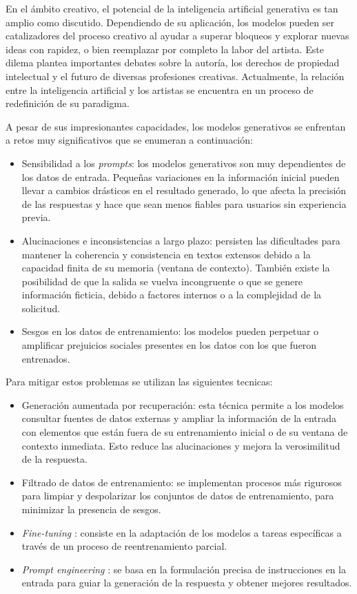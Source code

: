 En el ámbito creativo, el potencial de la inteligencia artificial generativa es tan amplio como discutido.
Dependiendo de su aplicación, los modelos pueden ser catalizadores del proceso creativo
al ayudar a superar bloqueos y explorar nuevas ideas con rapidez, o bien
reemplazar por completo la labor del artista. 
Este dilema plantea importantes debates sobre la autoría, los derechos de propiedad intelectual 
y el futuro de diversas profesiones creativas.
Actualmente, la relación entre la inteligencia artificial 
y los artistas se encuentra en un proceso de redefinición de su paradigma.

A pesar de sus impresionantes capacidades, 
los modelos generativos se enfrentan a retos muy significativos que se enumeran a continuación:
\begin{itemize}
\item Sensibilidad a los \textit{prompts}:
los modelos generativos son muy dependientes de los datos de entrada.
Pequeñas variaciones en la información inicial pueden llevar a cambios drásticos en el resultado generado,
lo que afecta la precisión de las respuestas y hace que sean menos fiables para usuarios sin experiencia previa.
\item Alucinaciones e inconsistencias a largo plazo:
persisten las dificultades para mantener la coherencia y consistencia
en textos extensos debido a la capacidad finita de su memoria (ventana de contexto).
También existe la posibilidad de que la salida se vuelva incongruente o que se genere información ficticia,
debido a factores internos o a la complejidad de la solicitud.
\item Sesgos en los datos de entrenamiento: 
los modelos pueden perpetuar o amplificar prejuicios sociales presentes en los datos con los que fueron entrenados.
\end{itemize}

Para mitigar estos problemas se utilizan las siguientes tecnicas:
\begin{itemize}
\item Generación aumentada por recuperación:
esta técnica permite a los modelos consultar fuentes de datos externas 
y ampliar la información de la entrada con elementos que están fuera de su entrenamiento inicial
o de su ventana de contexto inmediata.
Esto reduce las alucinaciones y mejora la verosimilitud de la respuesta.
\item Filtrado de datos de entrenamiento: 
se implementan procesos más rigurosos para limpiar y despolarizar los conjuntos de datos de entrenamiento,
para minimizar la presencia de sesgos.
\item \textit{Fine-tuning} \cite{Devlin2019BERT}: 
consiste en la adaptación de los modelos a tareas específicas a través de un proceso de reentrenamiento parcial.
\item \textit{Prompt engineering} \cite{Brown2020GPT3}:
se basa en la formulación precisa de instrucciones en la entrada para guiar la generación de la respuesta 
y obtener mejores resultados.
\end{itemize}

